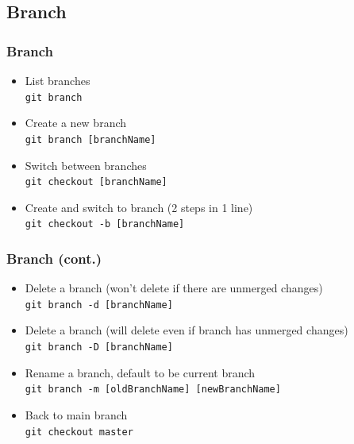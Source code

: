 \documentclass{beamer}
\begin{document}
		\subsection{Branch}
			\begin{frame}
				\frametitle{Branch}
				\begin{itemize}
					\item List branches\\
						\texttt{git branch}
					\item Create a new branch\\
						\texttt{git branch [branchName]}
					\item Switch between branches\\
						\texttt{git checkout [branchName]}
					\item Create and switch to branch (2 steps in 1 line)\\
						\texttt{git checkout -b [branchName]}
				\end{itemize}
			\end{frame}

			\begin{frame}
				\frametitle{Branch (cont.)}
				\begin{itemize}						
					\item Delete a branch (won't delete if there are unmerged changes)\\
						\texttt{git branch -d [branchName]}
					\item Delete a branch (will delete even if branch has unmerged changes)\\
						\texttt{git branch -D [branchName]}
					\item Rename a branch, default to be current branch\\
						\texttt{git branch -m [oldBranchName] [newBranchName]}
					\item Back to main branch\\
						\texttt{git checkout master}
				\end{itemize}
			\end{frame}
\end{document}
